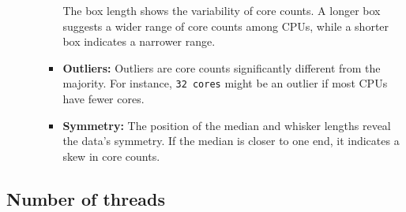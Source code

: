 \documentclass{article}
\begin{document}
\begin{itemize}
\begin{itemize}
\begin{itemize}
				The box length shows the variability of core counts. A longer box suggests a wider range of core counts among CPUs, while a shorter box indicates a narrower range.
				\item \textbf{Outliers:} 
				Outliers are core counts significantly different from the majority. For instance, \texttt{32 cores} might be an outlier if most CPUs have fewer cores.
				\item \textbf{Symmetry:} 
				The position of the median and whisker lengths reveal the data's symmetry. If the median is closer to one end, it indicates a skew in core counts.
			\end{itemize}
		\end{itemize}
	\end{itemize}
	\subsection{Number of threads}
\end{document}
